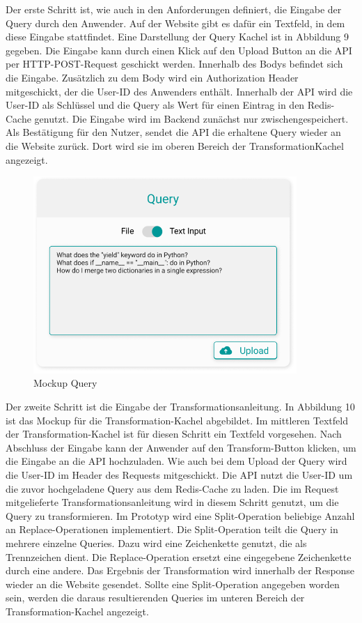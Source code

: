 Der erste Schritt ist, wie auch in den Anforderungen definiert, die Eingabe der Query durch den Anwender. Auf der Website gibt es dafür ein Textfeld, in dem diese Eingabe stattfindet. Eine Darstellung der \glqq Query\grqq{} Kachel ist in Abbildung 9 gegeben. Die Eingabe kann durch einen Klick auf den \glqq Upload\grqq{} Button an die API per HTTP-POST-Request geschickt werden. Innerhalb des Bodys befindet sich die Eingabe. Zusätzlich zu dem Body wird ein Authorization Header mitgeschickt, der die User-ID des Anwenders enthält. Innerhalb der API wird die User-ID als Schlüssel und die Query als Wert für einen Eintrag in den Redis-Cache genutzt. Die Eingabe wird im Backend zunächst nur zwischengespeichert. Als Bestätigung für den Nutzer, sendet die API die erhaltene Query wieder an die Website zurück. Dort wird sie im oberen Bereich der \glqq Transformation\grqq Kachel angezeigt. 

\begin{figure}[H]
  \centering
    \includegraphics[width = 10cm]{bilder/mockupQuery}
    \caption{Mockup Query}
\end{figure}

Der zweite Schritt ist die Eingabe der Transformationsanleitung. In Abbildung 10 ist das Mockup für die Transformation-Kachel abgebildet. Im mittleren Textfeld der Transformation-Kachel ist für diesen Schritt ein Textfeld vorgesehen. Nach Abschluss der Eingabe kann der Anwender auf den Transform-Button klicken, um die Eingabe an die API hochzuladen. Wie auch bei dem Upload der Query wird die User-ID im Header des Requests mitgeschickt. Die API nutzt die User-ID um die zuvor hochgeladene Query aus dem Redis-Cache zu laden. Die im Request mitgelieferte Transformationsanleitung wird in diesem Schritt genutzt, um die Query zu transformieren. Im Prototyp wird eine Split-Operation beliebige Anzahl an Replace-Operationen implementiert. Die Split-Operation teilt die Query in mehrere einzelne Queries. Dazu wird eine Zeichenkette genutzt, die als Trennzeichen dient. Die Replace-Operation ersetzt eine eingegebene Zeichenkette durch eine andere. Das Ergebnis der Transformation wird innerhalb der Response wieder an die Website gesendet. Sollte eine Split-Operation angegeben worden sein, werden die daraus resultierenden Queries im unteren Bereich der Transformation-Kachel angezeigt. 

